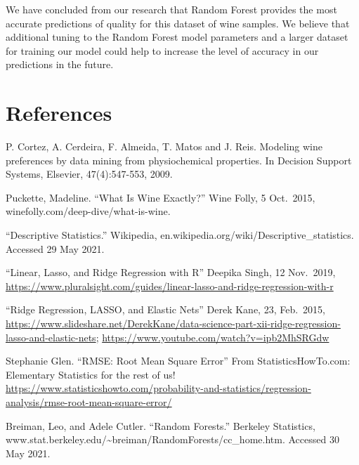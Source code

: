 \documentclass[
]{book}
\begin{document}
We have concluded from our research that Random Forest provides the most accurate predictions of quality for this dataset of wine samples. We believe that additional tuning to the Random Forest model parameters and a larger dataset for training our model could help to increase the level of accuracy in our predictions in the future.

\hypertarget{references}{%
\chapter{References}\label{references}}

P. Cortez, A. Cerdeira, F. Almeida, T. Matos and J. Reis.
Modeling wine preferences by data mining from physiochemical properties. In Decision Support Systems, Elsevier, 47(4):547-553, 2009.

Puckette, Madeline. ``What Is Wine Exactly?'' Wine Folly, 5 Oct.~2015, winefolly.com/deep-dive/what-is-wine.

``Descriptive Statistics.'' Wikipedia, en.wikipedia.org/wiki/Descriptive\_statistics. Accessed 29 May 2021.

``Linear, Lasso, and Ridge Regression with R'' Deepika Singh, 12 Nov.~2019, \url{https://www.pluralsight.com/guides/linear-lasso-and-ridge-regression-with-r}

``Ridge Regression, LASSO, and Elastic Nets'' Derek Kane, 23, Feb.~2015, \url{https://www.slideshare.net/DerekKane/data-science-part-xii-ridge-regression-lasso-and-elastic-nets}; \url{https://www.youtube.com/watch?v=ipb2MhSRGdw}

Stephanie Glen. ``RMSE: Root Mean Square Error'' From StatisticsHowTo.com: Elementary Statistics for the rest of us! \url{https://www.statisticshowto.com/probability-and-statistics/regression-analysis/rmse-root-mean-square-error/}

Breiman, Leo, and Adele Cutler. ``Random Forests.'' Berkeley Statistics, www.stat.berkeley.edu/\textasciitilde breiman/RandomForests/cc\_home.htm. Accessed 30 May 2021.
\end{document}
